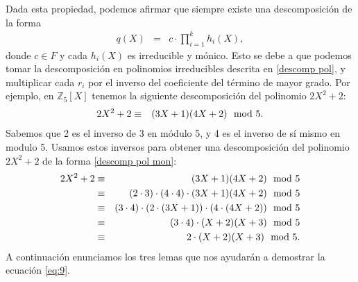 Dada esta propiedad,
podemos afirmar que siempre existe una descomposición de la
forma
\begin{eqnarray}
  q(X) & = & c\cdot \prod\limits_{i=1}^k h_i(X), \label{descomp pol mon}
\end{eqnarray}
donde $c\in F$ y cada $h_i(X)$ es irreducible y mónico. Esto se debe a
que podemos tomar la descomposición en polinomios irreducibles
descrita en \eqref{descomp pol}, y multiplicar cada $r_i$ por el
inverso del coeficiente del término de mayor grado. Por ejemplo, en
$\mathbb{Z}_{5}[X]$ tenemos la siguiente descomposición del polinomio
$2X^2 + 2$:
\begin{eqnarray*}
2X^2 + 2 & \equiv & (3X+1)(4X+2) \mod 5.
\end{eqnarray*}
Sabemos que 2 es el inverso de 3 en módulo 5, y 4 es el inverso de sí
mismo en modulo 5. Usamos estos inversos para obtener una
descomposición del polinomio $2X^2 + 2$ de la forma \eqref{descomp pol
  mon}:
\begin{eqnarray*}
  2X^2 + 2 & \equiv & (3X+1)(4X+2) \mod 5\\
  & \equiv & (2\cdot 3) \cdot (4 \cdot 4) \cdot (3X+1)(4X+2) \mod 5\\
  & \equiv & (3 \cdot 4) \cdot (2 \cdot (3X+1))\cdot(4 \cdot (4X+2)) \mod 5\\
  & \equiv & (3 \cdot 4) \cdot (X+2)(X+3) \mod 5\\
    & \equiv & 2\cdot (X+2)(X+3) \mod 5.
\end{eqnarray*}
A continuación enunciamos los tres lemas que nos ayudarán a demostrar
la ecuación \eqref{eq:9}.
     
